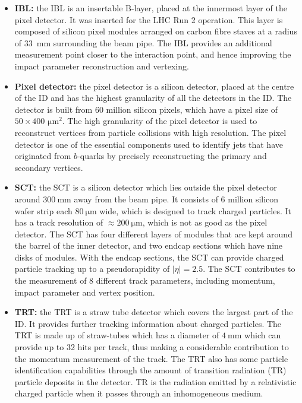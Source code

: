 \begin{itemize}
	\item  \textbf{IBL:} the IBL is an insertable B-layer, placed at the innermost layer of the pixel detector. It was inserted for the LHC Run 2 operation. This layer is composed of silicon pixel modules arranged on carbon fibre staves at a radius of \SI{33}{\milli\meter} surrounding the beam pipe. The IBL provides an additional measurement point closer to the interaction point, and hence improving the impact parameter reconstruction and vertexing.~\cite{ibl}
	
	\item \textbf{Pixel detector:} the pixel detector is a silicon detector, placed at the centre of the ID and has the highest granularity of all the detectors in the ID. The detector is built from 60 million silicon pixels, which have a pixel size of $50\times400$ $\si{\micro\metre^{\text{2}}}$. The high granularity of the pixel detector is used to reconstruct vertices from particle collisions with high resolution. The pixel detector is one of the essential components used to identify jets that have originated from $b$-quarks by precisely reconstructing the primary and secondary vertices.~\cite{atlas}
	
	\item \textbf{SCT:} the SCT is a silicon detector which lies outside the pixel detector around $\SI{300}{\milli\meter}$ away from the beam pipe. It consists of 6 million silicon wafer strip each $\SI{80}{\micro\meter}$ wide, which is designed to track charged particles. It has a track resolution of $\approx\SI{200}{\micro\meter}$, which is not as good as the pixel detector. The SCT has four different layers of modules that are kept around the barrel of the inner detector, and two endcap sections which have nine disks of modules. With the endcap sections, the SCT can provide charged particle tracking up to a pseudorapidity of $|\eta|=2.5$. The SCT contributes to the measurement of 8 different track parameters, including momentum, impact parameter and vertex position.~\cite{atlas}
	
	\item \textbf{TRT:} the TRT is a straw tube detector which covers the largest part of the ID. It provides further tracking information about charged particles. The TRT is made up of straw-tubes which has a diameter of $\SI{4}{\milli\meter}$ which can provide up to 32 hits per track, thus making a considerable contribution to the momentum measurement of the track. The TRT also has some particle identification capabilities through the amount of transition radiation (TR) particle deposits in the detector. TR is the radiation emitted by a relativistic charged particle when it passes through an inhomogeneous medium.~\cite{atlas}
\end{itemize}

